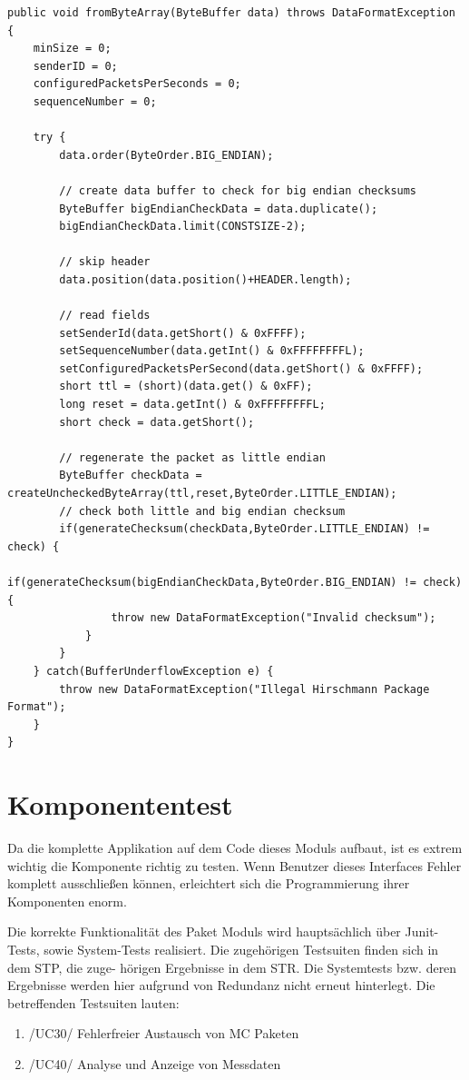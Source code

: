 \newpage
\begin{lstlisting}
public void fromByteArray(ByteBuffer data) throws DataFormatException
{
    minSize = 0;
    senderID = 0;
    configuredPacketsPerSeconds = 0;
    sequenceNumber = 0;
   
    try {
        data.order(ByteOrder.BIG_ENDIAN);
       
        // create data buffer to check for big endian checksums
        ByteBuffer bigEndianCheckData = data.duplicate();
        bigEndianCheckData.limit(CONSTSIZE-2);
       
        // skip header
        data.position(data.position()+HEADER.length);
       
        // read fields
        setSenderId(data.getShort() & 0xFFFF);
        setSequenceNumber(data.getInt() & 0xFFFFFFFFL);
        setConfiguredPacketsPerSecond(data.getShort() & 0xFFFF);
        short ttl = (short)(data.get() & 0xFF);
        long reset = data.getInt() & 0xFFFFFFFFL;
        short check = data.getShort();
       
        // regenerate the packet as little endian
        ByteBuffer checkData = createUncheckedByteArray(ttl,reset,ByteOrder.LITTLE_ENDIAN);
        // check both little and big endian checksum
        if(generateChecksum(checkData,ByteOrder.LITTLE_ENDIAN) != check) {
            if(generateChecksum(bigEndianCheckData,ByteOrder.BIG_ENDIAN) != check) {
                throw new DataFormatException("Invalid checksum");
            }
        }
    } catch(BufferUnderflowException e) {
        throw new DataFormatException("Illegal Hirschmann Package Format");
    }
}
\end{lstlisting}


\chapter{Komponententest}

Da die komplette Applikation auf dem Code dieses Moduls aufbaut, ist es extrem wichtig die
Komponente richtig zu testen. Wenn Benutzer dieses Interfaces Fehler komplett ausschließen können, erleichtert sich 
die Programmierung ihrer Komponenten enorm. 

Die korrekte Funktionalität des Paket Moduls wird hauptsächlich über Junit-Tests, sowie
System-Tests realisiert. Die zugehörigen Testsuiten finden sich in dem STP, die zuge-
hörigen Ergebnisse in dem STR. Die Systemtests bzw. deren Ergebnisse werden hier
aufgrund von Redundanz nicht erneut hinterlegt.
Die betreffenden Testsuiten lauten:
\begin{enumerate}
\item /UC30/ Fehlerfreier Austausch von MC Paketen
\item /UC40/ Analyse und Anzeige von Messdaten 
\end{enumerate}


